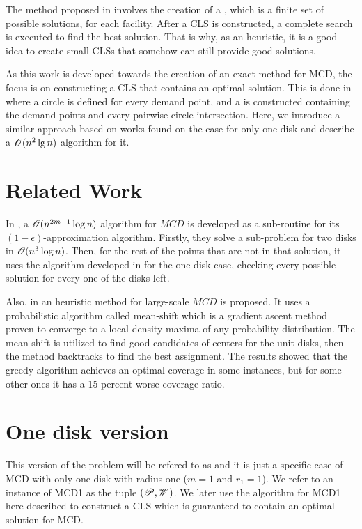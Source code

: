 The method proposed in  involves the creation of a , which is a finite set of possible solutions, for each facility. After a CLS is constructed, a complete search is executed to find the best solution. That is why, as an heuristic, it is a good idea to create small CLSs that somehow can still provide good solutions. 

As this work is developed towards the creation of an exact method for MCD, the focus is on constructing a CLS that contains an optimal solution.
This is done in  where a circle is defined for every demand point, and a  is constructed containing the demand points and every pairwise circle intersection.
Here, we introduce a similar approach based on works found on the case for only one disk and describe a $\mathscr{O}(n^2\lg{n})$ algorithm for it.

\section{Related Work}
In , a $\mathscr{O}(n^{2m-1}\log{n})$ algorithm for $MCD$ is developed as a sub-routine for its $(1-\epsilon)$-approximation algorithm. Firstly, they solve a sub-problem for two disks in $\mathscr{O}(n^3\log{n})$. Then, for the rest of the points that are not in that solution, it uses the algorithm developed in  for the one-disk case, checking every possible solution for every one of the disks left.

Also, in  an heuristic method for large-scale $MCD$ is proposed. It uses a probabilistic algorithm called mean-shift which is a gradient ascent method proven to converge to a local density maxima of any probability distribution. The mean-shift is utilized to find good candidates of centers for the unit disks, then the method backtracks to find the best assignment. The results showed that the greedy algorithm achieves an optimal coverage in some instances, but for some other ones it has a 15 percent worse coverage ratio.

\section{One disk version}

This version of the problem will be refered to as  and it is just a specific case of MCD with only one disk with radius one ($m=1$ and $r_1=1$). We refer to an instance of MCD1 as the tuple $(\mathscr{P}, \mathscr{W})$.
We later use the algorithm for MCD1 here described to construct a CLS which is guaranteed to contain an optimal solution for MCD.

